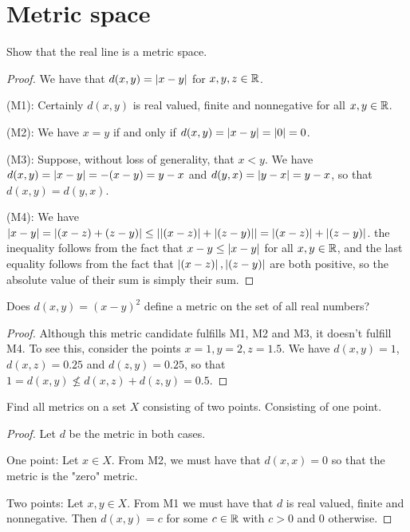 \section{Metric space}


\begin{exercise}{1}
Show that the real line is a metric space.
\end{exercise}
\begin{proof}
We have that $d(x,y)=\left\lvert x-y\right\rvert$ for $x,y,z\in\mathbb{R}$.

(M1): Certainly $d(x,y)$ is real valued, finite and nonnegative for all $x,y\in\mathbb{R}$.

(M2): We have $x=y$ if and only if $d(x,y)=\left\lvert x-y\right\rvert=\left\lvert 0\right\rvert=0$.

(M3): Suppose, without loss of generality, that $x<y$. We have $d(x,y) =\left\lvert x-y\right\rvert =-(x-y) =y-x$ and $d(y,x) =\left\lvert y-x\right\rvert =y-x$, so that $d(x,y)=d(y,x)$.

(M4): We have $\left\lvert x-y\right\rvert =\left\lvert (x-z)+(z-y)\right\rvert\leq \left\lvert \left\lvert (x-z)\right\rvert+\left\lvert (z-y)\right\rvert\right\rvert =\left\lvert (x-z)\right\rvert+\left\lvert (z-y)\right\rvert$. the inequality follows from the fact that $x-y \leq\left\lvert x-y\right\rvert$ for all $x,y\in\mathbb{R}$, and the last equality follows from the fact that $\left\lvert (x-z)\right\rvert, \left\lvert (z-y)\right\rvert$ are both positive, so the absolute value of their sum is simply their sum.
\end{proof}

\begin{exercise}{2}
Does $d(x,y)=(x-y)^2$ define a metric on the set of all real numbers?
\end{exercise}
\begin{proof}
Although this metric candidate fulfills M1, M2 and M3, it doesn't fulfill M4. To see this, consider the points $x=1,y=2,z=1.5$. We have $d(x,y)=1$, $d(x,z)=0.25$ and $d(z,y)=0.25$, so that $1=d(x,y)\not\leq d(x,z)+d(z,y) =0.5$.
\end{proof}

\begin{exercise}{4}
Find all metrics on a set $X$ consisting of two points. Consisting of one point.
\end{exercise}
\begin{proof}
Let $d$ be the metric in both cases.

One point: Let $x\in X$. From M2, we must have that $d(x,x) =0$ so that the metric is the "zero" metric.

Two points: Let $x,y\in X$. From M1 we must have that $d$ is real valued, finite and nonnegative. Then $d(x,y)=c$ for some $c\in\mathbb{R}$ with $c>0$ and 0 otherwise.
\end{proof}

